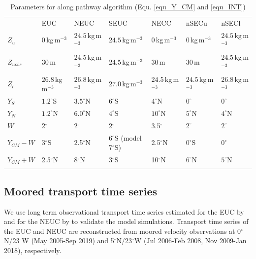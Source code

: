\documentclass[os, manuscript]{copernicus}
\begin{document}
	\begin{table}[t]
		\caption{Parameters for along pathway algorithm (Equ. \ref{equ_Y_CM} and \ref{equ_INT})}
		\begin{tabular}{lllllll}
			\tophline
			& EUC & NEUC & SEUC & NECC & nSECu & nSECl \\
			\middlehline
			$ Z_{u} $ & $0\,$kg$\,$m$^{-3}$ & $24.5\,$kg$\,$m$^{-3}$ & $24.5\,$kg$\,$m$^{-3}$ & $0\,$kg$\,$m$^{-3}$ & $0\,$kg$\,$m$^{-3}$  & $24.5\,$kg$\,$m$^{-3}$\\
			$ Z_{u obs} $ & $30\,$m & $24.5\,$kg$\,$m$^{-3}$ & $24.5\,$kg$\,$m$^{-3}$ & $30\,$m & $30\,$m  & $24.5\,$kg$\,$m$^{-3}$\\
			$ Z_{l} $ & $26.8\,$kg$\,$m$^{-3}$ & $26.8\,$kg$\,$m$^{-3}$ & $27.0\, $kg$\,$m$^{-3}$ & $24.5\,$kg$\,$m$^{-3}$ & $24.5\,$kg$\,$m$^{-3}$ & $26.8\,$kg$\,$m$^{-3}$ \\
			$ Y_{S} $ & $1.2^{\circ}$S & $3.5^{\circ}$N & $6^{\circ}$S & $4^{\circ}$N & $0^{\circ}$ & $0^{\circ}$ \\
			$ Y_{N} $ & $1.2^{\circ}$N & $6.0^{\circ}$N & $4^{\circ}$S & $10^{\circ}$N & $5^{\circ}$N & $4^{\circ}$N \\
			$ W $ & 2$^{\circ}$ & 2$^{\circ}$ & 2$^{\circ}$ & 3.5$^{\circ}$ & $2^{\circ}$ & $2^{\circ}$ \\
			$ Y_{CM}-W $ & 3$^{\circ}$S & 2.5$^{\circ}$N & 6$^{\circ}$S (model 7$^{\circ}$S) & 2.5$^{\circ}$N& $0^{\circ}$S & $0 ^{\circ}$ \\
			$ Y_{CM}+W $ & 2.5$^{\circ}$N & 8$^{\circ}$N & 3$^{\circ}$S & 10$^{\circ}$N & $6^{\circ}$N & $5 ^{\circ}$N \\
			\bottomhline
		\end{tabular}
		\label{tab_boundary_conditions}
	\end{table}
	
	
	\subsection{Moored transport time series}
	We use long term observational transport time series estimated for the EUC by \cite{Brandt2021a,Brandt2014} and for the NEUC by \cite{Burmeister2020} to validate the model simulations. Transport time series of the EUC and NEUC are reconstructed from moored velocity observations at 0$ ^{\circ} $N/23$ ^{\circ} $W (May 2005-Sep 2019) and 5$ ^{\circ} $N/23$ ^{\circ} $W (Jul 2006-Feb 2008, Nov 2009-Jan 2018), respectively. 
	
\end{document}
